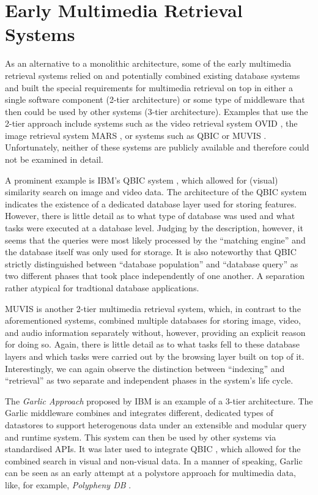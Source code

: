 \section{Early Multimedia Retrieval Systems}

As an alternative to a monolithic architecture, some of the early multimedia retrieval systems relied on and potentially combined existing database systems and built the special requirements for multimedia retrieval on top in either a single software component (2-tier architecture) or some type of middleware that then could be used by other systems (3-tier architecture). Examples that use the 2-tier approach include systems such as the video retrieval system OVID \cite{Oomoto:1993OVID}, the image retrieval system MARS \cite{Rui:1997Content}, or systems such as QBIC \cite{Flickner:1995Query} or MUVIS \cite{Kiranyaz:2003Muvis}. Unfortunately, neither of these systems are publicly available and therefore could not be examined in detail.

A prominent example is IBM's QBIC system \cite{Flickner:1995Query}, which allowed for (visual) similarity search on image and video data. The architecture of the QBIC system indicates the existence of a dedicated database layer used for storing features. However, there is little detail as to what type of database was used and what tasks were executed at a database level. Judging by the description, however, it seems that the queries were most likely processed by the ``matching engine'' and the database itself was only used for storage. It is also noteworthy that QBIC strictly distinguished between ``database population'' and ``database query'' as two different phases that took place independently of one another. A separation rather atypical for tradtional database applications.

MUVIS \cite{Kiranyaz:2003Muvis} is another 2-tier multimedia retrieval system, which, in contrast to the aforementioned systems, combined multiple databases for storing image, video, and audio information separately without, however, providing an explicit reason for doing so. Again, there is little detail as to what tasks fell to these database layers and which tasks were carried out by the browsing layer built on top of it. Interestingly, we can again observe the distinction between ``indexing'' and ``retrieval'' as two separate and independent phases in the system's life cycle.

The \emph{Garlic Approach} \cite{Carey:1995Towards} proposed by IBM is an example of a 3-tier architecture. The Garlic middleware combines and integrates different, dedicated types of datastores to support heterogenous data under an extensible and modular query and runtime system. This system can then be used by other systems via standardised APIs. It was later used to integrate QBIC \cite{Cody:1995Querying}, which allowed for the combined search in visual and non-visual data. In a manner of speaking, Garlic can be seen as an early attempt at a polystore approach for multimedia data, like, for example, \emph{Polypheny DB} \cite{Vogt:2018Polypheny}. 

